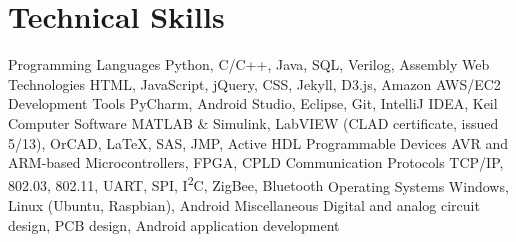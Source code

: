 \section{Technical Skills}
\begin{cvskills}
  \cvskill
    {Programming Languages}
    {Python, C/C++, Java, SQL, Verilog, Assembly}
  \cvskill
    {Web Technologies}
    {HTML, JavaScript, jQuery, CSS, Jekyll, D3.js, Amazon AWS/EC2}
  \cvskill
    {Development Tools}
    {PyCharm, Android Studio, Eclipse, Git, IntelliJ IDEA, Keil}
  \cvskill
    {Computer Software}
    {MATLAB \& Simulink, LabVIEW (CLAD certificate, issued 5/13), OrCAD, \LaTeX, SAS, JMP, Active HDL}
  \cvskill
    {Programmable Devices}
    {AVR and ARM-based Microcontrollers, FPGA, CPLD}
  \cvskill
    {Communication Protocols}
    {TCP/IP, 802.03, 802.11, UART, SPI, I\textsuperscript{2}C, ZigBee, Bluetooth}
  \cvskill
    {Operating Systems}
    {Windows, Linux (Ubuntu, Raspbian), Android}
  \cvskill
    {Miscellaneous}
    {Digital and analog circuit design, PCB design, Android application development}
\end{cvskills} 